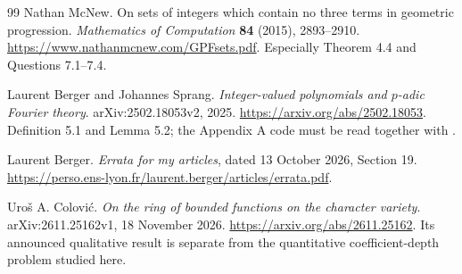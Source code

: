 \begin{thebibliography}{99}
Nathan McNew.
On sets of integers which contain no three terms in geometric progression.
\emph{Mathematics of Computation} \textbf{84} (2015), 2893--2910.
\url{https://www.nathanmcnew.com/GPFsets.pdf}.
Especially Theorem 4.4 and Questions 7.1--7.4.

Laurent Berger and Johannes Sprang.
\emph{Integer-valued polynomials and \(p\)-adic Fourier theory}.
arXiv:2502.18053v2, 2025.
\url{https://arxiv.org/abs/2502.18053}.
Definition 5.1 and Lemma 5.2; the Appendix A code must be read
together with \cite{BergerErrata}.

Laurent Berger.
\emph{Errata for my articles}, dated 13 October 2026, Section 19.
\url{https://perso.ens-lyon.fr/laurent.berger/articles/errata.pdf}.

Uro\v{s} A. Colovi\'c.
\emph{On the ring of bounded functions on the character variety}.
arXiv:2611.25162v1, 18 November 2026.
\url{https://arxiv.org/abs/2611.25162}.
Its announced qualitative result is separate from the quantitative
coefficient-depth problem studied here.
\end{thebibliography}
